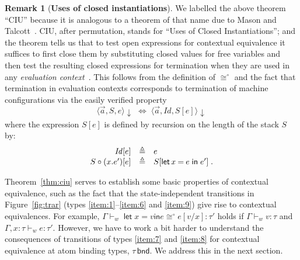 \documentclass{LMCS}
\theoremstyle{plain}
\theoremstyle{definition}
\newtheorem{remark}[thm]{Remark}
\newcommand{\bimp}{\Leftrightarrow}
\newcommand{\BINDTY}{\kw{bnd}}
\newcommand{\comp}{\circ}
\newcommand{\config}[3]{\langle#1, #2, #3\rangle}
\newcommand{\defeq}{\triangleq}
\newcommand{\ent}{\vdash}
\newcommand{\EQ}{\mathbin{\kw{=}}}
\newcommand{\es}{\mathit{Id}}
\renewcommand{\exp}[1][e]{#1}
\newcommand{\IN}{\mathrel{\kw{in}}}
\newcommand{\LET}{\mathop{\kw{let}}}
\newcommand{\kw}[1]{\mathsf{#1}}
\newcommand{\ofty}{:}
\newcommand{\opeqo}{\cong^{\circ}}
\newcommand{\s}[1][a]{\vec{#1}}
\newcommand{\stk}[1][S]{#1}
\newcommand{\sub}[2]{{[#2/#1]}}
\newcommand{\terminates}[1][]{{\downarrow_{#1}}}
\newcommand{\ty}{\tau}
\newcommand{\val}[1][v]{#1}
\newcommand{\vid}[1][x]{#1}
\newcommand{\w}[1][w]{#1}
\begin{document}
\begin{remark}[\textbf{Uses of closed instantiations}]
  \label{rem:ciu}
  We labelled the above theorem ``CIU'' because it is analogous to a
  theorem of that name due to Mason and Talcott~\cite{MasonIA:equfle}.
  CIU, after permutation, stands for ``Uses of Closed
  Instantiations''; and the theorem tells us that to test open
  expressions for contextual equivalence it suffices to first close
  them by substituting closed values for free variables and then test
  the resulting closed expressions for termination when they are used
  in any \emph{evaluation context}~\cite{FelleisenM:revrst}. This
  follows from the definition of $\opeqo$ and the fact that
  termination in evaluation contexts corresponds to termination of
  machine configurations via the easily verified property
  \begin{equation}
    \label{eq:2}
    \config{\s}{\stk}{\exp}\terminates \;\bimp\; 
    \config{\s}{\es}{\stk{[\exp]}}\terminates
  \end{equation}
  where the expression $\stk{[\exp]}$ is defined by recursion on the
  length of the stack $\stk$ by:
  \begin{equation}
    \label{eq:3}
    \begin{array}[c]{rcl}
      \es[\exp] &\defeq& \exp\\
      \stk\comp(\vid.\exp')[\exp] &\defeq& \stk{[\LET {\vid\EQ\exp} \IN
        \exp']}\;.
    \end{array}
  \end{equation}
\end{remark}

Theorem~\ref{thm:ciu} serves to establish some basic properties of
contextual equivalence, such as the fact that the state-independent
transitions in Figure~\ref{fig:trar} (types \ref{item:1}--\ref{item:6}
and \ref{item:9}) give rise to contextual equivalences. For example,
$\Gamma\ent_{\w} \LET {\vid\EQ\val} \IN \exp \opeqo
\exp\sub{\vid}{\val} \ofty \ty'$ holds if
$\Gamma\ent_{\w}\val\ofty\ty$ and
$\Gamma,\vid\ofty\ty\ent_{\w}\exp\ofty\ty'$. However, we have to work
a bit harder to understand the consequences of transitions of types
\ref{item:7} and \ref{item:8} for contextual equivalence at atom
binding types, $\ty\,\BINDTY$. We address this in the next section.
\end{document}

